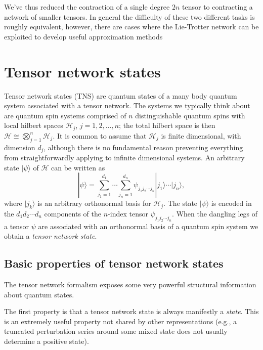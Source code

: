 \documentclass[twocolumn,lengthcheck,superscriptaddress]{revtex4-1}
\theoremstyle{definition}
\theoremstyle{remark}
\begin{document}
We've thus reduced the contraction of a single degree $2n$ tensor to contracting a network of smaller tensors. In general the difficulty of these two different tasks is roughly equivalent, however, there are cases where the Lie-Trotter network can be exploited to develop useful approximation methods


\section{Tensor network states}
Tensor network states (TNS) are quantum states of a many body quantum system associated with a tensor network. The systems we typically think about are quantum spin systems comprised of $n$ distinguishable quantum spins with local hilbert spaces $\mathcal{H}_j$, $j = 1, 2, \ldots, n$; the total hilbert space is then $\mathcal{H}\cong \bigotimes_{j=1}^{n} \mathcal{H}_j$. It is common to assume that $\mathcal{H}_j$ is finite dimensional, with dimension $d_j$, although there is no fundamental reason preventing everything from straightforwardly applying to infinite dimensional systems. An arbitrary state $|\psi\rangle$ of $\mathcal{H}$ can be written as
\begin{equation}
	|\psi\rangle = \sum_{j_1 = 1}^{d_1}\cdots \sum_{j_{n} = 1}^{d_{n} } \psi_{j_1j_2 \cdots j_{n}}|j_1\rangle \cdots |j_{n}\rangle,
\end{equation} 
where $|j_k\rangle$ is an arbitrary orthonormal basis for $\mathcal{H}_j$. The state $|\psi\rangle$ is encoded in the $d_1d_2\cdots d_n$ components of the $n$-index tensor $\psi_{j_1j_2 \cdots j_{n}}$.  When the dangling legs of a tensor $\psi$ are associated with an orthonormal basis of a quantum spin system we obtain a \emph{tensor network state}.

\subsection{Basic properties of tensor network states}The tensor network formalism exposes some very powerful structural information about quantum states. 

The first property is that a tensor network state is always manifestly a \emph{state}. This is an extremely useful property not shared by other representations (e.g., a truncated perturbation series around some mixed state does not usually determine a positive state).
\end{document}
